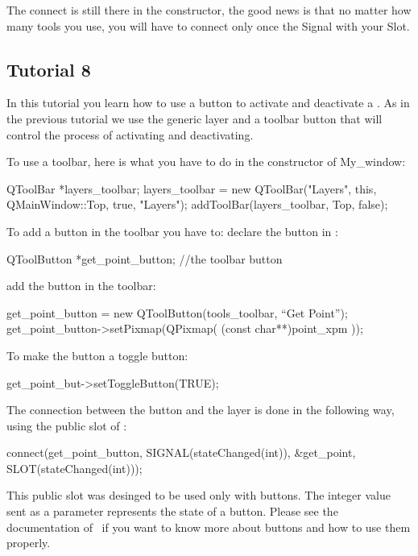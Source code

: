 The connect is still there in the constructor, the good news is that
no matter how many tools you use, you will have to connect only once
the {\sc Signal} with your {\sc Slot}.

\subsection*{Tutorial 8}

In this tutorial you learn how to use a button to activate and
deactivate a . As in the previous tutorial
we use the generic layer  and a
toolbar button that will control the process of activating and deactivating.

To use a toolbar, here is what you have to do in the constructor of My\_window:
\begin{ccExampleCode}
QToolBar  *layers_toolbar;
layers_toolbar = new QToolBar("Layers", this, QMainWindow::Top, true, "Layers");
addToolBar(layers_toolbar, Top, false);
\end{ccExampleCode}
To add a button in the toolbar you have to:
declare the button in :
\begin{ccExampleCode}
QToolButton *get_point_button;     //the toolbar button
\end{ccExampleCode}
add the button in the toolbar:
\begin{ccExampleCode}
get_point_button = new QToolButton(tools_toolbar, ``Get Point'');
get_point_button->setPixmap(QPixmap( (const char**)point_xpm ));
\end{ccExampleCode}
To make the button a toggle button:
\begin{ccExampleCode}
get_point_but->setToggleButton(TRUE);
\end{ccExampleCode}
The connection between the button and the layer is done in the
following way, using the  public slot of :
\begin{ccExampleCode}
    connect(get_point_button, SIGNAL(stateChanged(int)),
	    &get_point, SLOT(stateChanged(int)));
\end{ccExampleCode}
\begin{ccAdvanced}
This public slot was desinged to be used only with \qt\/ buttons. The
integer value sent as a parameter represents the state of a \qt\/
button. Please see the documentation of \qt\ if you want to know more
about buttons and how to use them properly.
\end{ccAdvanced}








